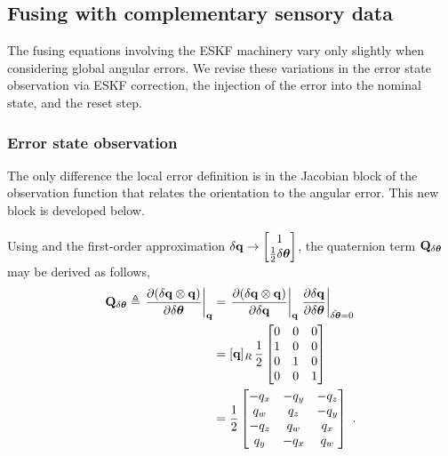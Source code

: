 \subsection{Fusing with complementary sensory data}

The fusing equations involving the ESKF machinery vary only slightly when considering global angular errors. 
We revise these variations in the error state observation via ESKF correction, the injection of the error into the nominal state, and the reset step.

\subsubsection{Error state observation}

The only difference \wrt the local error definition is in the Jacobian block of the observation function that relates the orientation to the angular error. 
This new block is developed below.

Using  and the first-order approximation $\delta{\bf q}\rightarrow \begin{bmatrix}
1 \\ \frac12\delta{\bm \theta}
\end{bmatrix}$, the quaternion term ${\bf Q}_{\delta{\bm \theta}}$ may be derived as follows,
%
\begin{subequations}
\begin{align}
{\bf Q}_{\delta{\bm \theta}} \triangleq \left.\frac{\partial(\delta{\bf q}\otimes{\bf q})}{\partial\delta{\bm \theta}}\right|_{{\bf q}} 
&=\left.\frac{\partial(\delta{\bf q}\otimes{\bf q})}{\partial\delta{\bf q}}\right|_{{\bf q}} \left.\frac{\partial\delta{\bf q}}{\partial\delta{\bm \theta}}\right|_{\hat{\delta{\bm \theta}}=0} \\
&= [{\bf q}]_R\,\frac12\begin{bmatrix}
0 & 0 & 0 \\
1 & 0 & 0 \\
0 & 1 & 0 \\
0 & 0 & 1 \\
\end{bmatrix} \\
&= \frac{1}{2}\begin{bmatrix}
-q_x &-q_y &-q_z\\
 q_w & q_z &-q_y\\
-q_z & q_w & q_x\\
 q_y &-q_x & q_w\\
\end{bmatrix}~.
\end{align}
\end{subequations}


